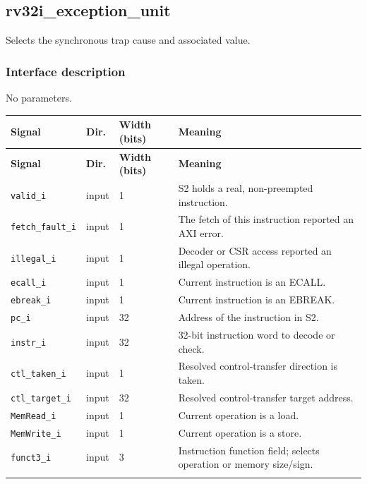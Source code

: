 \documentclass[11pt]{article}
\begin{document}
\subsection{rv32i\_exception\_unit}
Selects the synchronous trap cause and associated value.
\subsubsection{Interface description}
\noindent No parameters.\par\medskip
{\small
\begin{longtable}{@{}L{0.3400\dimexpr\linewidth-36pt\relax}L{0.1000\dimexpr\linewidth-36pt\relax}L{0.1000\dimexpr\linewidth-36pt\relax}L{0.4600\dimexpr\linewidth-36pt\relax}@{}}
\toprule
\textbf{Signal} & \textbf{Dir.} & \textbf{Width (bits)} & \textbf{Meaning} \\ \midrule
\endfirsthead
\toprule
\textbf{Signal} & \textbf{Dir.} & \textbf{Width (bits)} & \textbf{Meaning} \\ \midrule
\endhead
\texttt{valid\_i} & input & 1 & S2 holds a real, non-preempted instruction. \\ \addlinespace[3pt]
\texttt{fetch\_fault\_i} & input & 1 & The fetch of this instruction reported an AXI error. \\ \addlinespace[3pt]
\texttt{illegal\_i} & input & 1 & Decoder or CSR access reported an illegal operation. \\ \addlinespace[3pt]
\texttt{ecall\_i} & input & 1 & Current instruction is an ECALL. \\ \addlinespace[3pt]
\texttt{ebreak\_i} & input & 1 & Current instruction is an EBREAK. \\ \addlinespace[3pt]
\texttt{pc\_i} & input & 32 & Address of the instruction in S2. \\ \addlinespace[3pt]
\texttt{instr\_i} & input & 32 & 32-bit instruction word to decode or check. \\ \addlinespace[3pt]
\texttt{ctl\_taken\_i} & input & 1 & Resolved control-transfer direction is taken. \\ \addlinespace[3pt]
\texttt{ctl\_target\_i} & input & 32 & Resolved control-transfer target address. \\ \addlinespace[3pt]
\texttt{MemRead\_i} & input & 1 & Current operation is a load. \\ \addlinespace[3pt]
\texttt{MemWrite\_i} & input & 1 & Current operation is a store. \\ \addlinespace[3pt]
\texttt{funct3\_i} & input & 3 & Instruction function field; selects operation or memory size/sign. \\ \addlinespace[3pt]

\end{longtable}}
\end{document}
